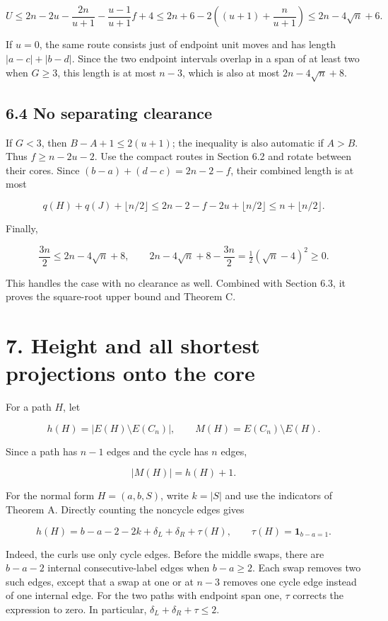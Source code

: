 \documentclass[11pt,a4paper]{article}
\begin{document}
\[ U\le2n-2u-\frac{2n}{u+1}
-\frac{u-1}{u+1}f+4
\le2n+6-2\left((u+1)+\frac n{u+1}\right)
\le2n-4\sqrt n+6. \]

If \(u=0\), the same route consists just of endpoint unit moves and has length \(|a-c|+|b-d|\). Since the two endpoint intervals overlap in a span of at least two when \(G\ge3\), this length is at most \(n-3\), which is also at most \(2n-4\sqrt n+8\).

\hypertarget{no-separating-clearance}{%
\subsection{6.4 No separating clearance}\label{no-separating-clearance}}

If \(G<3\), then \(B-A+1\le2(u+1)\); the inequality is also automatic if \(A>B\). Thus \(f\ge n-2u-2\). Use the compact routes in Section 6.2 and rotate between their cores. Since \((b-a)+(d-c)=2n-2-f\), their combined length is at most

\[ q(H)+q(J)+\lfloor n/2\rfloor
\le2n-2-f-2u+\lfloor n/2\rfloor
\le n+\lfloor n/2\rfloor. \]

Finally,

\[ \frac{3n}{2}\le2n-4\sqrt n+8,
\qquad
2n-4\sqrt n+8-\frac{3n}{2}=
\tfrac12(\sqrt n-4)^2\ge0. \]

This handles the case with no clearance as well. Combined with Section 6.3, it proves the square-root upper bound and Theorem C.

\hypertarget{height-and-all-shortest-projections-onto-the-core}{%
\section{7. Height and all shortest projections onto the core}\label{height-and-all-shortest-projections-onto-the-core}}

For a path \(H\), let

\[ h(H)=|E(H)\setminus E(C_n)|,\qquad
M(H)=E(C_n)\setminus E(H). \]

Since a path has \(n-1\) edges and the cycle has \(n\) edges,

\[ |M(H)|=h(H)+1. \tag{3} \]

For the normal form \(H=(a,b,S)\), write \(k=|S|\) and use the indicators of Theorem A. Directly counting the noncycle edges gives

\[ h(H)=b-a-2-2k+\delta_L+\delta_R+\tau(H),\qquad
\tau(H)=\mathbf1_{b-a=1}. \tag{4} \]

Indeed, the curls use only cycle edges. Before the middle swaps, there are \(b-a-2\) internal consecutive-label edges when \(b-a\ge2\). Each swap removes two such edges, except that a swap at one or at \(n-3\) removes one cycle edge instead of one internal edge. For the two paths with endpoint span one, \(\tau\) corrects the expression to zero. In particular, \(\delta_L+\delta_R+\tau\le2\).
\end{document}
